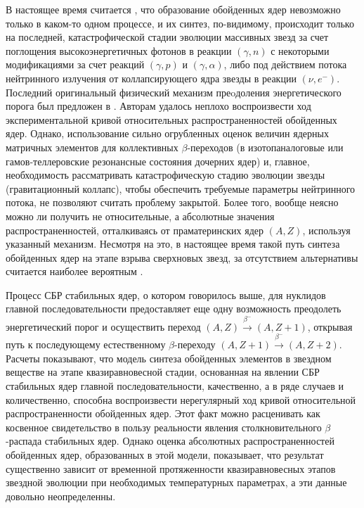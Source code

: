В настоящее время считается \cite{97}, что образование обойденных ядер невозможно только в каком-то одном процессе, и их
синтез, по-видимому, происходит только на последней, катастрофической стадии эволюции массивных звезд за счет поглощения
высокоэнергетичных фотонов в реакции $(\gamma, n)$ с некоторыми модификациями за счет реакций $(\gamma, p)$ и $(\gamma,
\alpha)$, либо под действием потока нейтринного излучения от коллапсирующего ядра звезды в реакции $(\nu, e^-)$.
Последний оригинальный физический механизм преoдоления энергетического порога был предложен в \cite{nadeghin}.
Авторам  \cite{nadeghin} удалось неплохо воспроизвести ход экспериментальной кривой относительных распространенностей
обойденных ядер. Однако, использование сильно огрубленных оценок величин ядерных матричных элементов для коллективных
$\beta$-переходов (в изотопаналоговые или гамов-теллеровские резонансные состояния дочерних ядер) и, главное,
необходимость рассматривать катастрофическую стадию эволюции звезды (гравитационный коллапс), чтобы обеспечить требуемые
параметры нейтринного потока, не позволяют считать проблему закрытой. Более того, вообще неясно можно ли получить не
относительные, а абсолютные значения распространенностей, отталкиваясь от праматеринских ядер $(A,Z)$, используя
указанный механизм. Несмотря на это, в настоящее время такой путь синтеза обойденных ядер на этапе взрыва сверхновых
звезд, за отсутствием альтернативы считается наиболее вероятным \cite{kosmos, 97}.




Процесс СБР стабильных ядер, о котором говорилось выше, для нуклидов главной
последовательности
предоставляет еще одну возможность преодолеть энергетический порог
и осуществить переход
$(A,Z)\stackrel{\beta^-}{\longrightarrow} (A,Z+1)$, открывая путь к
последующему естественному $\beta$-переходу
$(A,Z+1)\stackrel{\beta^-}{\longrightarrow} (A,Z+2)$.
Расчеты показывают, что модель синтеза обойденных элементов в звездном
веществе на этапе квазиравновесной стадии, основанная на явлении СБР
стабильных ядер главной последовательности, качественно, а в ряде случаев и
количественно, способна воспроизвести нерегулярный ход кривой относительной
распространенности обойденных ядер. Этот факт можно расценивать как косвенное
свидетельство в пользу реальности явления столкновительного $\beta$-распада
стабильных ядер. Однако оценка абсолютных распространенностей обойденных ядер,
образованных в этой модели, показывает, что
результат существенно зависит от временной протяженности квазиравновесных
этапов звездной эволюции при необходимых температурных параметрах,
а эти данные довольно неопределенны.

